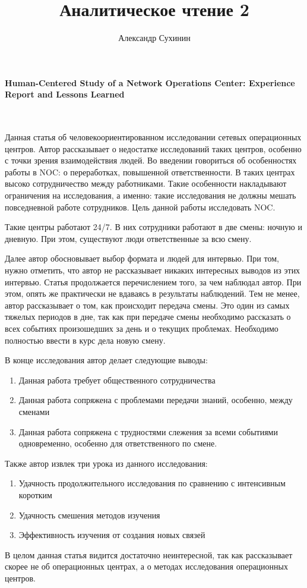 \documentclass[10pt,a4paper]{article}
\author{Александр Сухинин}
\title{Аналитическое чтение 2}
\begin{document}
\maketitle

\paragraph{Human-Centered Study of a Network Operations Center: Experience Report and Lessons Learned}
~

Данная статья об человекоориентированном исследовании сетевых операционных центров. Автор рассказывает о недостатке исследований таких центров, особенно с точки зрения взаимодействия людей. Во введении говориться об особенностях работы в NOC: о переработках, повышенной ответственности. В таких центрах высоко сотрудничество между работниками. Такие особенности накладывают ограничения на исследования, а именно: такие исследования не должны мешать повседневной работе сотрудников. Цель данной работы исследовать NOC. 

Такие центры работают 24/7. В них сотрудники работают в две смены: ночную и дневную. При этом, существуют люди ответственные за всю смену. 

Далее автор обосновывает выбор формата и людей для интервью. При том, нужно отметить, что автор не рассказывает никаких интересных выводов из этих интервью. Статья продолжается перечислением того, за чем наблюдал автор. При этом, опять же практически не вдаваясь в результаты наблюдений. Тем не менее, автор рассказывает о том, как происходит передача смены. Это один из самых тяжелых периодов в дне, так как при передаче смены необходимо рассказать о всех событиях произошедших за день и о текущих проблемах. Необходимо полностью ввести в курс дела новую смену.

В конце исследования автор делает следующие выводы:

\begin{enumerate}
\item Данная работа требует общественного сотрудничества
\item Данная работа сопряжена с проблемами передачи знаний, особенно, между сменами
\item Данная работа сопряжена с трудностями слежения за всеми событиями одновременно, особенно для ответственного по смене.
\end{enumerate}

Также автор извлек три урока из данного исследования:
\begin{enumerate}
\item Удачность продолжительного исследования по сравнению с интенсивным коротким
\item Удачность смешения методов изучения
\item Эффективность изучения от создания новых связей
\end{enumerate}

В целом данная статья видится достаточно неинтересной, так как рассказывает скорее не об операционных центрах, а о методах исследования операционных центров.
\end{document}
